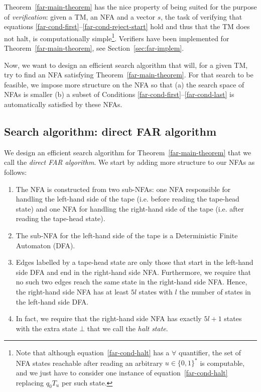 \begin{remark}[Verification]\label{far-remark-verification}
  Theorem~\ref{far-main-theorem} has the nice property of being suited for the purpose of \textit{verification}: given a TM, an NFA and a vector $s$, the task of verifying that equations \eqref{far-cond-first}--\eqref{far-cond-reject-start} hold and thus that the TM does not halt, is computationally simple\footnote{Note that although equation~\eqref{far-cond-halt} has a $\forall$ quantifier, the set of NFA states reachable after reading an arbitrary $u \in \{0,1\}^*$ is computable, and we just have to consider one instance of equation~\eqref{far-cond-halt} replacing $q_0 T_u$ per such state.}. Verifiers have been implemented for Theorem~\ref{far-main-theorem}, see Section~\ref{sec:far-implem}.
\end{remark}


Now, we want to design an efficient search algorithm that will, for a given TM, try to find an NFA satisfying Theorem~\ref{far-main-theorem}. For that search to be feasible, we impose more structure on the NFA so that (a) the search space of NFAs is smaller (b) a subset of Conditions \eqref{far-cond-first}--\eqref{far-cond-last} is automatically satisfied by these NFAs.


\subsection{Search algorithm: direct FAR algorithm}
\label{far-algo-direct}

We design an efficient search algorithm for Theorem~\ref{far-main-theorem} that we call the \textit{direct FAR algorithm}. We start by adding more structure to our NFAs as follows:


\begin{enumerate}

  \item The NFA is constructed from two sub-NFAs: one NFA responsible for handling the left-hand side of the tape (i.e. before reading the tape-head state) and one NFA for handling the right-hand side of the tape (i.e. after reading the tape-head state).
  \item The sub-NFA for the left-hand side of the tape is a Deterministic Finite Automaton (DFA).
  \item Edges labelled by a tape-head state are only those that start in the left-hand side DFA and end in the right-hand side NFA. Furthermore, we require that no such two edges reach the same state in the right-hand side NFA. Hence, the right-hand side NFA has at least $5l$ states with $l$ the number of states in the left-hand side DFA.\label{pt:injective}
  \item In fact, we require that the right-hand side NFA has exactly $5l+1$ states with the extra state $\bot$ that we call the \textit{halt state}.

\end{enumerate}

